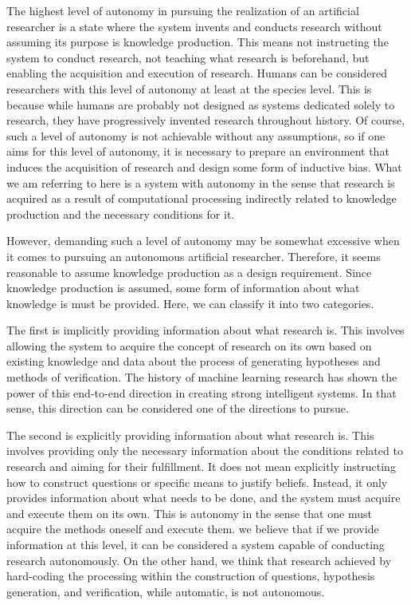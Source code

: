 \documentclass{book}
\begin{document}
The highest level of autonomy in pursuing the realization of an artificial researcher is a state where the system invents and conducts research without assuming its purpose is knowledge production. This means not instructing the system to conduct research, not teaching what research is beforehand, but enabling the acquisition and execution of research. Humans can be considered researchers with this level of autonomy at least at the species level. This is because while humans are probably not designed as systems dedicated solely to research, they have progressively invented research throughout history. Of course, such a level of autonomy is not achievable without any assumptions, so if one aims for this level of autonomy, it is necessary to prepare an environment that induces the acquisition of research and design some form of inductive bias. What we am referring to here is a system with autonomy in the sense that research is acquired as a result of computational processing indirectly related to knowledge production and the necessary conditions for it.

However, demanding such a level of autonomy may be somewhat excessive when it comes to pursuing an autonomous artificial researcher. Therefore, it seems reasonable to assume knowledge production as a design requirement. Since knowledge production is assumed, some form of information about what knowledge is must be provided. Here, we can classify it into two categories.

The first is implicitly providing information about what research is. This involves allowing the system to acquire the concept of research on its own based on existing knowledge and data about the process of generating hypotheses and methods of verification. The history of machine learning research has shown the power of this end-to-end direction in creating strong intelligent systems. In that sense, this direction can be considered one of the directions to pursue.

The second is explicitly providing information about what research is. This involves providing only the necessary information about the conditions related to research and aiming for their fulfillment. It does not mean explicitly instructing how to construct questions or specific means to justify beliefs. Instead, it only provides information about what needs to be done, and the system must acquire and execute them on its own. This is autonomy in the sense that one must acquire the methods oneself and execute them. we believe that if we provide information at this level, it can be considered a system capable of conducting research autonomously. On the other hand, we think that research achieved by hard-coding the processing within the construction of questions, hypothesis generation, and verification, while automatic, is not autonomous.
\end{document}

